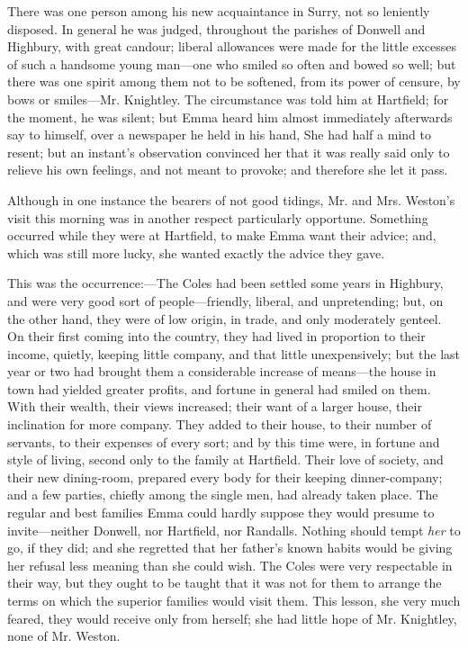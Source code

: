 There was one person among his new acquaintance in Surry, not so leniently disposed. In general he was judged, throughout the parishes of Donwell and Highbury, with great candour; liberal allowances were made for the little excesses of such a handsome young man---one who smiled so often and bowed so well; but there was one spirit among them not to be softened, from its power of censure, by bows or smiles---Mr. Knightley. The circumstance was told him at Hartfield; for the moment, he was silent; but Emma heard him almost immediately afterwards say to himself, over a newspaper he held in his hand,  She had half a mind to resent; but an instant's observation convinced her that it was really said only to relieve his own feelings, and not meant to provoke; and therefore she let it pass.

Although in one instance the bearers of not good tidings, Mr. and Mrs. Weston's visit this morning was in another respect particularly opportune. Something occurred while they were at Hartfield, to make Emma want their advice; and, which was still more lucky, she wanted exactly the advice they gave.

This was the occurrence:---The Coles had been settled some years in Highbury, and were very good sort of people---friendly, liberal, and unpretending; but, on the other hand, they were of low origin, in trade, and only moderately genteel. On their first coming into the country, they had lived in proportion to their income, quietly, keeping little company, and that little unexpensively; but the last year or two had brought them a considerable increase of means---the house in town had yielded greater profits, and fortune in general had smiled on them. With their wealth, their views increased; their want of a larger house, their inclination for more company. They added to their house, to their number of servants, to their expenses of every sort; and by this time were, in fortune and style of living, second only to the family at Hartfield. Their love of society, and their new dining-room, prepared every body for their keeping dinner-company; and a few parties, chiefly among the single men, had already taken place. The regular and best families Emma could hardly suppose they would presume to invite---neither Donwell, nor Hartfield, nor Randalls. Nothing should tempt {\em her} to go, if they did; and she regretted that her father's known habits would be giving her refusal less meaning than she could wish. The Coles were very respectable in their way, but they ought to be taught that it was not for them to arrange the terms on which the superior families would visit them. This lesson, she very much feared, they would receive only from herself; she had little hope of Mr. Knightley, none of Mr. Weston.

